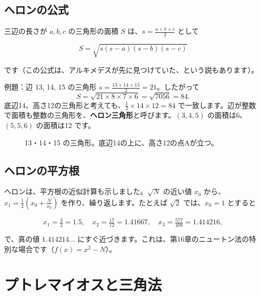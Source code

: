 \documentclass[a4paper,11pt,openany]{ltjsbook}
\begin{document}
\subsection{ヘロンの公式}

三辺の長さが $a,b,c$ の三角形の面積 $S$ は、$s=\tfrac{a+b+c}{2}$ として

\[
S=\sqrt{s(s-a)(s-b)(s-c)}
\]

です（この公式は、アルキメデスが先に見つけていた、という説もあります）。

\begin{examplebox}{例題：辺 13, 14, 15 の三角形}
$s=\tfrac{13+14+15}{2}=21$。したがって
\[
S=\sqrt{21\times8\times7\times6}=\sqrt{7056}=84.
\]
底辺14、高さ12の三角形と考えても、$\tfrac12\times14\times12=84$ で一致します。辺が整数で面積も整数の三角形を、\textbf{ヘロン三角形}と呼びます。$(3,4,5)$ の面積は6、$(5,5,6)$ の面積は12 です。
\end{examplebox}

\begin{figure}[htbp]
\centering
{}
\caption{13・14・15 の三角形。底辺14の上に、高さ12の点Aが立つ。}
\end{figure}

\subsection{ヘロンの平方根}

ヘロンは、平方根の近似計算も示しました。$\sqrt N$ の近い値 $x_0$ から、$x_1=\tfrac12\left(x_0+\tfrac N{x_0}\right)$ を作り、繰り返します。たとえば $\sqrt{2}$ では、$x_0=1$ とすると

\[
x_1=\tfrac32=1.5,\quad x_2=\tfrac{17}{12}=1.41667,\quad x_3=\tfrac{577}{408}=1.414216,
\]

で、真の値 $1.414214\ldots$ にすぐ近づきます。これは、第16章のニュートン法の特別な場合です（$f(x)=x^2-N$）。

\section{プトレマイオスと三角法}
\end{document}
